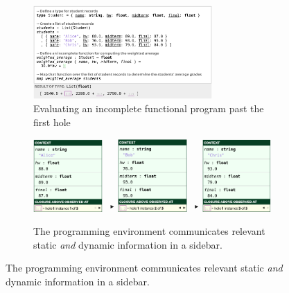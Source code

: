 
\begin{figure}[t]
\begin{subfigure}[t]{\textwidth}
\centering
\includegraphics[width=0.75\textwidth,interpolate=false]{images/grades-cell-mockup.png}
\vspace{-3px}
\caption{Evaluating an incomplete functional program past the first hole}
\label{fig:grades-cell-mockup}
\end{subfigure}

\vspace{10px}

\begin{subfigure}[t]{\textwidth}
\centering
\includegraphics[width=0.29\textwidth,interpolate=false]{images/grades-sidebar-1.png}
~${}^\blacktriangleright$
\includegraphics[width=0.29\textwidth,interpolate=false]{images/grades-sidebar-2.png}
~${}^\blacktriangleright$
\includegraphics[width=0.29\textwidth,interpolate=false]{images/grades-sidebar-3.png}
\caption{The programming environment communicates relevant static \emph{and} dynamic information in a sidebar.}
\label{fig:grades-sidebar}
\end{subfigure}


\end{figure}
